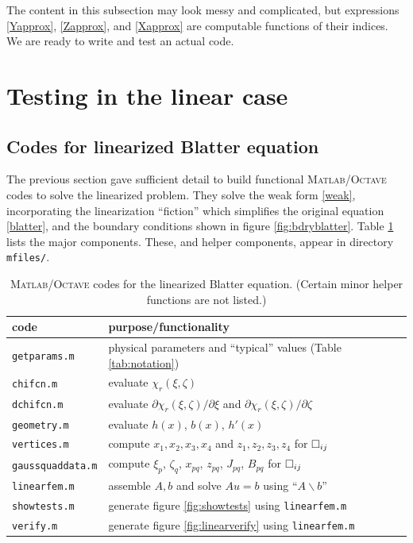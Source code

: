 \documentclass[11pt,final,reqno]{amsart}
\theoremstyle{remark}
\theoremstyle{definition}
\newcommand{\Matlab}{\textsc{Matlab}\xspace}
\newcommand{\Octave}{\textsc{Octave}\xspace}
\begin{document}
The content in this subsection may look messy and complicated, but expressions \eqref{Yapprox}, \eqref{Zapprox}, and \eqref{Xapprox} are computable functions of their indices.  We are ready to write and test an actual code.


\newpage
\section{Testing in the linear case}\label{sec:linear testing}

\subsection*{Codes for linearized Blatter equation}  The previous section gave sufficient detail to build functional \Matlab/\Octave codes to solve the linearized problem.  They solve the weak form \eqref{weak}, incorporating the linearization ``fiction'' which simplifies the original equation \eqref{blatter}, and the boundary conditions shown in figure \ref{fig:bdryblatter}.  Table \ref{tab:linearcodes} lists the major components.  These, and helper components, appear in directory \texttt{mfiles/}.

\begin{table}[h]
\caption{\Matlab/\Octave codes for the linearized Blatter equation.  (Certain minor helper functions are not listed.)}
\label{tab:linearcodes}
\begin{tabular}{@{}ll}
code  & purpose/functionality \\ 
\hline
\texttt{getparams.m}\phantom{\huge h \normalsize} & physical parameters and ``typical'' values (Table \ref{tab:notation}) \\
\texttt{chifcn.m}    & evaluate $\chi_r(\xi,\zeta)$  \\
\texttt{dchifcn.m}   & evaluate $\partial\chi_r(\xi,\zeta)/\partial \xi$ and $\partial\chi_r(\xi,\zeta)/\partial \zeta$ \\
\texttt{geometry.m}  & evaluate $h(x)$, $b(x)$, $h'(x)$ \\
\texttt{vertices.m}  & compute $x_1,x_2,x_3,x_4$ and $z_1,z_2,z_3,z_4$ for $\square_{ij}$ \\
\texttt{gaussquaddata.m} & compute $\xi_p$, $\zeta_q$, $x_{pq}$, $z_{pq}$, $J_{pq}$, $B_{pq}$  for $\square_{ij}$ \\
\texttt{linearfem.m} & assemble $A,b$ and solve $A u = b$ using ``$A\backslash b$'' \\
\texttt{showtests.m} & generate figure \ref{fig:showtests} using \texttt{linearfem.m} \\
\texttt{verify.m}    & generate figure \ref{fig:linearverify} using \texttt{linearfem.m}
\end{tabular}
\end{table}
\end{document}
